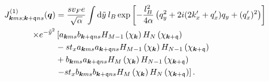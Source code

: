 \begin{equation}
  \begin{split}
    J^{(1)}_{\bm{k}ms; \bm{k}+\mathfrak{q} ns}(\bm{q}) &=
    \frac{s v_F e}{\sqrt{\alpha }} \int \mathrm{d}\tilde{y} \: l_B
    \exp \left[
      -\frac{l_{B}^2}{4 \alpha } \left(q_{y}^2 + 2i (2 k' _x + q' _x) q_{y} + (q'_x)^2 \right)
    \right]
   \\
   \times e^{-\tilde{y}^2}
   &\left[
    a_{\bm{k}ms}b_{\bm{k} + \mathfrak{q} ns}
    H_{M-1} \left(  \chi_{\bm{k}} \right)
    H_N\left( \chi_{\bm{k} + \mathfrak{q}} \right) \right.\\
    &- s t_{x} a_{\bm{k}ms}a_{\bm{k} + \mathfrak{q} ns}
    H_{M-1} \left( \chi_{\bm{k}} \right)
    H_{N-1}\left( \chi_{\bm{k} + \mathfrak{q}} \right)\\
   & +
    b_{\bm{k}ms} a_{\bm{k} + \mathfrak{q} ns}
    H_M \left( \chi_{\bm{k}} \right)
    H_{N-1} \left( \chi_{\bm{k} + \mathfrak{q}} \right)\\
    &\left. - s t_{x}
    b_{\bm{k}ms} b_{\bm{k} + \mathfrak{q} ns}
    H_M \left( \chi_{\bm{k}} \right)
    H_{N} \left(  \chi_{\bm{k} + \mathfrak{q}}\right)
    \right].
  \end{split}
\end{equation}

